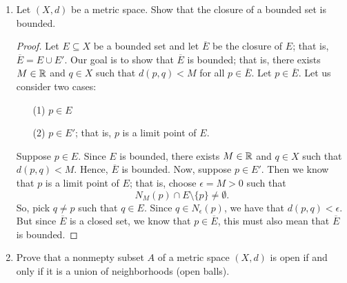 \documentclass[a4paper]{article}
\begin{document}
\begin{enumerate}
\begin{proof}
        With (2), suppose \( x \in A  \). We want to show that \( x \in \overline{E} \); that is, \( x  \) is either a limit point of \( E  \) or an element of \( E  \). Suppose that \( x  \) is NOT an element of \( E  \). By definition of \( A  \), we see that for all \( \epsilon > 0 \), 
        \[  {N}_{\epsilon}(x) \cap E \neq \emptyset.  \]
        If we take away \( x  \) from \( E  \), then the intersection above is nonempty; that is, 
        \[  {N}_{\epsilon}(x) \cap E \setminus  \{ x \} \neq \emptyset. \]
        Thus, \( x  \) is a limit point of \( E  \) and so \( x \in \overline{E} \). Otherwise, when \( x  \) is not a limit point of \( E  \), then the nonempty intersection
        \[  {N}_{\epsilon}(x) \cap E  \]
        implies that \( x \in E  \) and so \( x \in \overline{E} \). Thus, \( A \subseteq \overline{E} \).
    \end{proof}
\item Let \( (X,d) \) be a metric space. Show that the closure of a bounded set is bounded.
    \begin{proof}
    Let \( E \subseteq  X   \) be a bounded set and let \( \overline{E} \) be the closure of \( E  \); that is, \( \overline{E} = E \cup E' \). Our goal is to show that \( \overline{E}  \) is bounded; that is, there exists \( M \in \mathbb{R}  \) and \( q \in X  \) such that \( d(p,q) < M  \) for all \( p \in \overline{E} \). Let \( p \in \overline{E} \). Let us consider two cases:
    \begin{enumerate}
        \item[(1)] \( p \in E  \) 
        \item[(2)] \( p \in E' \); that is, \( p  \) is a limit point of \( E  \).
    \end{enumerate}
    Suppose \( p \in E  \). Since \( E  \) is bounded, there exists \( M \in \mathbb{R}  \) and \( q \in X  \) such that \( d(p,q) < M  \). Hence, \( \overline{E} \) is bounded. Now, suppose \( p \in E' \). Then we know that \( p  \) is a limit point of \( E  \); that is, choose \( \epsilon = M > 0  \) such that 
    \[ {N}_{M}(p) \cap E \setminus  \{ p \} \neq \emptyset.  \]
    So, pick \( q \neq p  \) such that \( q \in E  \). Since \( q \in {N}_{\epsilon}(p) \), we have that \( d(p,q) < \epsilon \). But since \( \overline{E} \) is a closed set, we know that \( p \in \overline{E} \), this must also mean that \( \overline{E} \) is bounded.  
    \end{proof}
\item Prove that a nonmepty subset \( A  \) of a metric space \( (X,d) \) is open if and only if it is a union of neighborhoods (open balls).

\end{enumerate}
\end{document}
